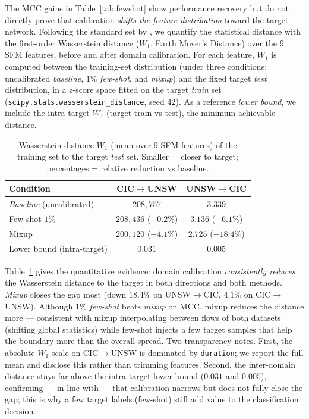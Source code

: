 \documentclass[preprint,12pt,authoryear]{elsarticle}
\begin{document}
The MCC gains in Table~\ref{tab:fewshot} show performance recovery but do not
directly prove that calibration \emph{shifts the feature distribution} toward the
target network. Following the standard set by \citet{layeghy}, we quantify the
statistical distance with the first-order Wasserstein distance ($W_1$, Earth
Mover's Distance) \citep{wasserstein} over the 9 SFM features, before and after
domain calibration. For each feature, $W_1$ is computed between the training-set
distribution (under three conditions: uncalibrated \emph{baseline}, $1\%$
\emph{few-shot}, and \emph{mixup}) and the fixed target \emph{test} distribution,
in a z-score space fitted on the target \emph{train} set
(\texttt{scipy.stats.wasserstein\_distance}, seed $42$). As a reference
\emph{lower bound}, we include the intra-target $W_1$ (target train vs test), the
minimum achievable distance.

\begin{table}[htbp]
\centering
\caption{Wasserstein distance $W_1$ (mean over 9 SFM features) of the training set
to the target \emph{test} set. Smaller = closer to target; percentages = relative
reduction vs baseline.}
\label{tab:wass}
\begin{tabular}{lcc}
\toprule
Condition & CIC$\rightarrow$UNSW & UNSW$\rightarrow$CIC \\
\midrule
\emph{Baseline} (uncalibrated) & $208{,}757$ & $3.339$ \\
Few-shot $1\%$        & $208{,}436$ ($-0.2\%$) & $3.136$ ($-6.1\%$) \\
Mixup                 & $200{,}120$ ($-4.1\%$) & $2.725$ ($-18.4\%$) \\
\midrule
Lower bound (intra-target) & $0.031$ & $0.005$ \\
\bottomrule
\end{tabular}
\end{table}

Table~\ref{tab:wass} gives the quantitative evidence: domain calibration
\emph{consistently reduces} the Wasserstein distance to the target in both
directions and both methods. \emph{Mixup} closes the gap most (down $18.4\%$ on
UNSW$\rightarrow$CIC, $4.1\%$ on CIC$\rightarrow$UNSW). Although $1\%$ \emph{few-shot}
beats \emph{mixup} on MCC, mixup reduces the distance more --- consistent with mixup
interpolating between flows of both datasets (shifting global statistics) while
few-shot injects a few target samples that help the boundary more than the overall
spread. Two transparency notes. First, the absolute $W_1$ scale on
CIC$\rightarrow$UNSW is dominated by \texttt{duration}; we report the full mean and
disclose this rather than trimming features. Second, the inter-domain distance stays
far above the intra-target lower bound
($0.031$ and $0.005$), confirming --- in line with \citet{layeghy} --- that
calibration narrows but does not fully close the gap; this is why a few target
labels (few-shot) still add value to the classification decision.
\end{document}
